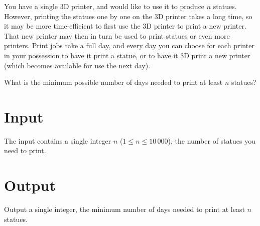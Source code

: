 
%

You have a single 3D printer, and would like to use it to produce $n$
statues.  However, printing the statues one by one on the 3D printer
takes a long time, so it may be more time-efficient to first use the
3D printer to print a new printer.  That new printer may then in turn
be used to print statues or even more printers.  Print jobs take a
full day, and every day you can choose for each printer in your
possession to have it print a statue, or to have it 3D print a new
printer (which becomes available for use the next day).

What is the minimum possible number of days needed to print at least $n$
statues?

\section*{Input}

The input contains a single integer $n$ ($1 \le n \le 10\,000$), the number of statues you need to print.

\section*{Output}

Output a single integer, the minimum number of days needed to print at least $n$ statues.

